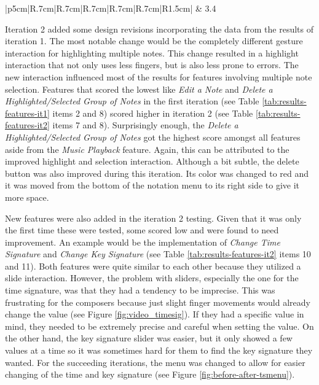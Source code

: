 \begin{longtable}{|p{5cm}|R{.7cm}|R{.7cm}|R{.7cm}|R{.7cm}|R{.7cm}|R{1.5cm}|}
					 & 3.4 \\ \hline
				\end{longtable}

				Iteration 2 added some design revisions incorporating the data from the results of iteration 1. The most notable change would be the completely different gesture interaction for highlighting multiple notes. This change resulted in a highlight interaction that not only uses less fingers, but is also less prone to errors. The new interaction influenced most of the results for features involving multiple note selection. Features that scored the lowest like \textit{Edit a Note} and \textit{Delete a Highlighted/Selected Group of Notes} in the first iteration (see Table \ref{tab:results-features-it1} items 2 and 8) scored higher in iteration 2 (see Table \ref{tab:results-features-it2} items 7 and 8). Surprisingly enough, the \textit{Delete a Highlighted/Selected Group of Notes} got the highest score amongst all features aside from the \textit{Music Playback} feature. Again, this can be attributed to the improved highlight and selection interaction. Although a bit subtle, the delete button was also improved during this iteration. Its color was changed to red and it was moved from the bottom of the notation menu to its right side to give it more space. 

				New features were also added in the iteration 2 testing. Given that it was only the first time these were tested, some scored low and were found to need improvement. An example would be the implementation of \textit{Change Time Signature} and \textit{Change Key Signature} (see Table \ref{tab:results-features-it2} items 10 and 11). Both features were quite similar to each other because they utilized a slide interaction. However, the problem with sliders, especially the one for the time signature, was that they had a tendency to be imprecise. This was frustrating for the composers because just slight finger movements would already change the value (see Figure \ref{fig:video_timesig}). If they had a specific value in mind, they needed to be extremely precise and careful when setting the value. On the other hand, the key signature slider was easier, but it only showed a few values at a time so it was sometimes hard for them to find the key signature they wanted. For the succeeding iterations, the menu was changed to allow for easier changing of the time and key signature (see Figure \ref{fig:before-after-tsmenu}).

